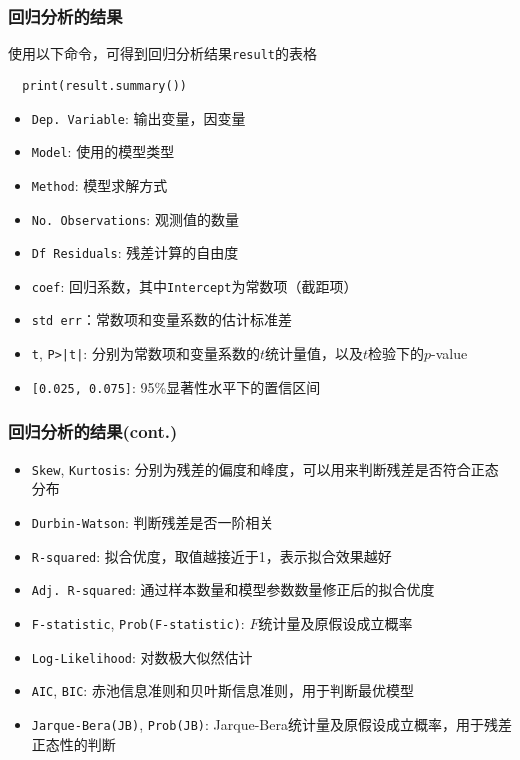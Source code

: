 \documentclass[t]{beamer}
\begin{document}
\begin{frame}[fragile]
  \frametitle{回归分析的结果}
  使用以下命令，可得到回归分析结果\verb|result|的表格
\begin{lstlisting}
  print(result.summary())
\end{lstlisting}
\normalsize
\begin{itemize}
  \item \verb|Dep. Variable|: 输出变量，因变量
  \item \verb|Model|: 使用的模型类型
  \item \verb|Method|: 模型求解方式
  \item \verb|No. Observations|: 观测值的数量
  \item \verb|Df Residuals|: 残差计算的自由度
  \item \verb|coef|: 回归系数，其中\verb|Intercept|为常数项（截距项）
  \item \verb|std err|：常数项和变量系数的估计标准差
  \item \verb|t|, \verb"P>|t|": 分别为常数项和变量系数的$t$统计量值，以及$t$检验下的$p$-value
  \item \verb|[0.025, 0.075]|: 95\%显著性水平下的置信区间
\end{itemize}

\end{frame}


\begin{frame}[fragile]
  \frametitle{回归分析的结果(cont.)}
\begin{itemize}
  \item  \verb|Skew|, \verb|Kurtosis|: 分别为残差的偏度和峰度，可以用来判断残差是否符合正态分布
  \item \verb|Durbin-Watson|: 判断残差是否一阶相关
  \item \verb|R-squared|: 拟合优度，取值越接近于1，表示拟合效果越好
  \item \verb|Adj. R-squared|: 通过样本数量和模型参数数量修正后的拟合优度
  \item \verb|F-statistic|, \verb|Prob(F-statistic)|: $F$统计量及原假设成立概率
  \item \verb|Log-Likelihood|: 对数极大似然估计
  \item \verb|AIC|, \verb|BIC|: 赤池信息准则和贝叶斯信息准则，用于判断最优模型
  \item \verb|Jarque-Bera(JB)|, \verb|Prob(JB)|: Jarque-Bera统计量及原假设成立概率，用于残差正态性的判断
\end{itemize}
  

\end{frame}
\end{document}
